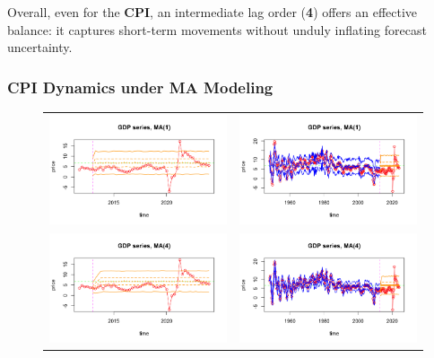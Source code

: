 \documentclass{Configuration_Files/PoliMi3i_thesis}
\begin{document}
Overall, even for the \textbf{CPI}, an intermediate lag order (\textbf{4}) offers an effective balance: it captures short-term movements without unduly inflating forecast uncertainty.

\subsubsection{CPI Dynamics under MA Modeling}

\begin{figure}[H]
  \centering
  \begin{tabular}{@{}cc@{}}
    \includegraphics[angle=270,width=0.3\linewidth]{zMA(1).png} &
    \includegraphics[angle=270,width=0.3\linewidth]{fMA(1).png} \\
    \includegraphics[angle=270,width=0.3\linewidth]{zMA(4).png} &
    \includegraphics[angle=270,width=0.3\linewidth]{fMA(4).png}
 \end{tabular}
\end{figure}

\end{document}
